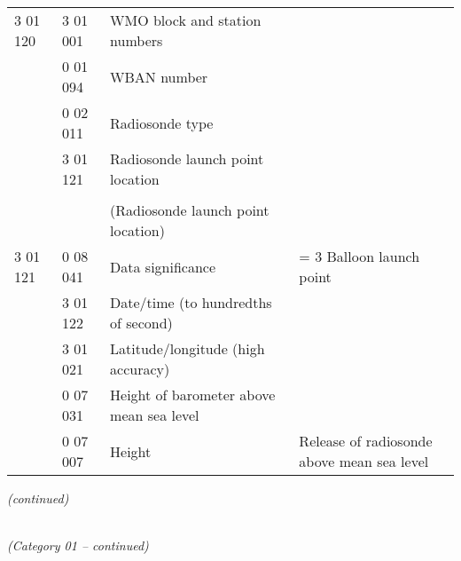 \begin{longtable}[]{@{}llll@{}}
3 01 120 & 3 01 001 & WMO block and station numbers &\tabularnewline
& 0 01 094 & WBAN number &\tabularnewline
& 0 02 011 & Radiosonde type &\tabularnewline
& 3 01 121 & Radiosonde launch point location &\tabularnewline
& & &\tabularnewline
& & (Radiosonde launch point location) &\tabularnewline
3 01 121 & 0 08 041 & Data significance & = 3 Balloon launch point\tabularnewline
& 3 01 122 & Date/time (to hundredths of second) &\tabularnewline
& 3 01 021 & Latitude/longitude (high accuracy) &\tabularnewline
& 0 07 031 & Height of barometer above mean sea level &\tabularnewline
& 0 07 007 & Height & Release of radiosonde above mean sea level\tabularnewline
\bottomrule
\end{longtable}

\emph{(continued)}

\emph{\\
(Category 01 -- continued)}

